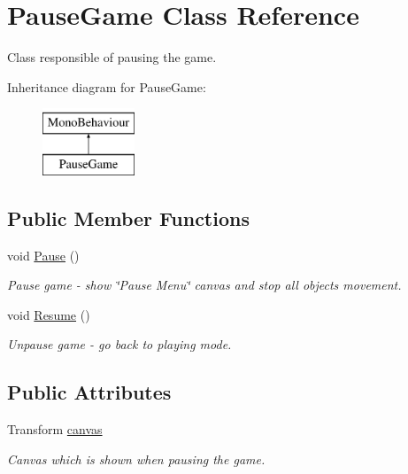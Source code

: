 \hypertarget{class_pause_game}{}\section{Pause\+Game Class Reference}
\label{class_pause_game}


Class responsible of pausing the game.  


Inheritance diagram for Pause\+Game\+:\begin{figure}[H]
\begin{center}
\leavevmode
\includegraphics[height=2.000000cm]{class_pause_game}
\end{center}
\end{figure}
\subsection*{Public Member Functions}
\begin{DoxyCompactItemize}
\item 
void \mbox{\hyperlink{class_pause_game_a931478b9fc65d240b62a1cfa68607684}{Pause}} ()
\begin{DoxyCompactList}\small\item\em Pause game -\/ show \char`\"{}\+Pause Menu\char`\"{} canvas and stop all objects\textquotesingle{} movement. \end{DoxyCompactList}\item 
void \mbox{\hyperlink{class_pause_game_a70d2c89455ef1f1970d5fc7b791b7566}{Resume}} ()
\begin{DoxyCompactList}\small\item\em Unpause game -\/ go back to playing mode. \end{DoxyCompactList}\end{DoxyCompactItemize}
\subsection*{Public Attributes}
\begin{DoxyCompactItemize}
\item 
Transform \mbox{\hyperlink{class_pause_game_adf677814c2492d0887efd5ea18e6bba4}{canvas}}
\begin{DoxyCompactList}\small\item\em Canvas which is shown when pausing the game. \end{DoxyCompactList}\end{DoxyCompactItemize}


